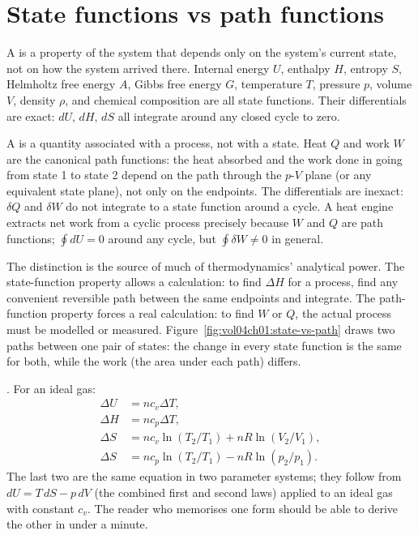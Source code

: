 \section{State functions vs path functions}
\label{sec:state-vs-path}

A  is a property of the system that depends
only on the system's current state, not on how the system arrived
there. Internal energy $U$, enthalpy $H$, entropy $S$, Helmholtz free
energy $A$, Gibbs free energy $G$, temperature $T$, pressure $p$,
volume $V$, density $\rho$, and chemical composition are all state
functions. Their differentials are exact: $dU$, $dH$, $dS$ all
integrate around any closed cycle to zero.

A  is a quantity associated with a process, not
with a state. Heat $Q$ and work $W$ are the canonical path functions:
the heat absorbed and the work done in going from state 1 to state 2
depend on the path through the $p$-$V$ plane (or any equivalent state
plane), not only on the endpoints. The differentials are inexact:
$\delta Q$ and $\delta W$ do not integrate to a state function around
a cycle. A heat engine extracts net work from a cyclic process
precisely because $W$ and $Q$ are path functions; $\oint dU = 0$
around any cycle, but $\oint \delta W \neq 0$ in general.

The distinction is the source of much of thermodynamics' analytical
power. The state-function property allows a calculation: to find
$\Delta H$ for a process, find any convenient reversible path between
the same endpoints and integrate. The path-function property forces a
real calculation: to find $W$ or $Q$, the actual process must be
modelled or measured.
Figure~\ref{fig:vol04ch01:state-vs-path} draws two paths between one
pair of states: the change in every state function is the same for
both, while the work (the area under each path) differs.



. For an
ideal gas:
\begin{align*}
\Delta U &= n c_v \Delta T, \\
\Delta H &= n c_p \Delta T, \\
\Delta S &= n c_v \ln(T_2/T_1) + nR \ln(V_2/V_1), \\
\Delta S &= n c_p \ln(T_2/T_1) - nR \ln(p_2/p_1).
\end{align*}
The last two are the same equation in two parameter systems; they
follow from $dU = T\,dS - p\,dV$ (the combined first and second laws)
applied to an ideal gas with constant $c_v$. The reader who memorises
one form should be able to derive the other in under a minute.

